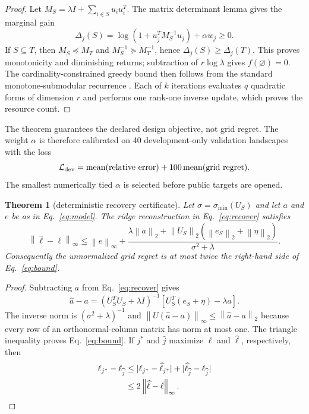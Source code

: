 \documentclass[10pt,letterpaper,twoside]{article}
\newtheorem{theorem}{Theorem}
\newcommand{\norm}[1]{\left\lVert #1\right\rVert}
\begin{document}
\begin{proof}
Let $M_S=\lambda I+\sum_{i\in S}u_i u_i^T$.  The matrix determinant lemma
gives the marginal gain
\begin{equation}
 \Delta_j(S)=\log(1+u_j^TM_S^{-1}u_j)+\alpha w_j\ge0. \label{eq:marginal}
\end{equation}
If $S\subseteq T$, then $M_S\preceq M_T$ and
$M_S^{-1}\succeq M_T^{-1}$, hence $\Delta_j(S)\ge\Delta_j(T)$.  This proves
monotonicity and diminishing returns; subtraction of $r\log\lambda$ gives
$f(\varnothing)=0$.  The cardinality-constrained greedy bound then follows
from the standard monotone-submodular recurrence
\cite{NemhauserWolseyFisher1978,KrauseSinghGuestrin2008}.
Each of $k$ iterations evaluates $q$ quadratic forms of dimension $r$ and
performs one rank-one inverse update, which proves the resource count.
\end{proof}

The theorem guarantees the declared design objective, not grid regret.  The
weight $\alpha$ is therefore calibrated on 40 development-only validation
landscapes with the loss
\begin{equation}
 \mathcal L_{\rm dev}=\operatorname{mean}(\text{relative error})
                 +100\operatorname{mean}(\text{grid regret}).
\end{equation}
The smallest numerically tied $\alpha$ is selected before public targets are
opened.

\begin{theorem}[deterministic recovery certificate]
\label{thm:recovery}
Let $\sigma=\sigma_{\min}(U_S)$ and let $a$ and $e$ be as in
Eq.~\eqref{eq:model}.  The ridge reconstruction in Eq.~\eqref{eq:recover}
satisfies
\begin{equation}
 \norm{\widehat\ell-\ell}_\infty
 \le \norm e_\infty+
 \frac{\lambda\norm a_2+\norm{U_S}_2(\norm{e_S}_2+\norm\eta_2)}
      {\sigma^2+\lambda}.                            \label{eq:bound}
\end{equation}
Consequently the unnormalized grid regret is at most twice the right-hand
side of Eq.~\eqref{eq:bound}.
\end{theorem}

\begin{proof}
Subtracting $a$ from Eq.~\eqref{eq:recover} gives
\begin{equation}
 \widehat a-a=(U_S^TU_S+\lambda I)^{-1}
 [U_S^T(e_S+\eta)-\lambda a].
\end{equation}
The inverse norm is $(\sigma^2+\lambda)^{-1}$ and
$\norm{U(\widehat a-a)}_\infty\le\norm{\widehat a-a}_2$ because every row
of an orthonormal-column matrix has norm at most one.  The triangle inequality
proves Eq.~\eqref{eq:bound}.  If $j^*$ and $\widehat j$ maximize $\ell$ and
$\widehat\ell$, respectively, then
\begin{align}
 \ell_{j^*}-\ell_{\widehat j}
 &\le |\ell_{j^*}-\widehat\ell_{j^*}|
     +|\widehat\ell_{\widehat j}-\ell_{\widehat j}|\notag\\
 &\le2\norm{\widehat\ell-\ell}_\infty.
\end{align}
\end{proof}
\end{document}

